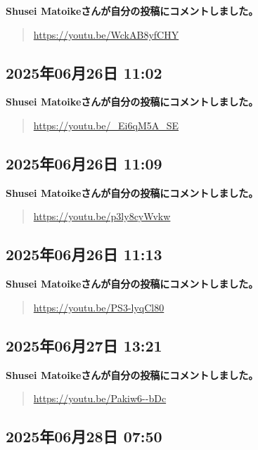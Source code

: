 \textbf{Shusei Matoikeさんが自分の投稿にコメントしました。}

\begin{quote}
\url{https://youtu.be/WckAB8yfCHY}
\end{quote}

\subsection*{2025年06月26日 11:02}

\textbf{Shusei Matoikeさんが自分の投稿にコメントしました。}

\begin{quote}
\url{https://youtu.be/_Ei6qM5A_SE}
\end{quote}

\subsection*{2025年06月26日 11:09}

\textbf{Shusei Matoikeさんが自分の投稿にコメントしました。}

\begin{quote}
\url{https://youtu.be/p3ly8cyWvkw}
\end{quote}

\subsection*{2025年06月26日 11:13}

\textbf{Shusei Matoikeさんが自分の投稿にコメントしました。}

\begin{quote}
\url{https://youtu.be/PS3-lyqCl80}
\end{quote}

\subsection*{2025年06月27日 13:21}

\textbf{Shusei Matoikeさんが自分の投稿にコメントしました。}

\begin{quote}
\url{https://youtu.be/Pakiw6--bDc}
\end{quote}

\subsection*{2025年06月28日 07:50}

